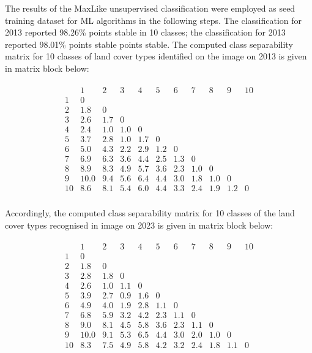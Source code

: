 \documentclass[final,5p,times,twocolumn]{elsarticle}
\begin{document}
The results of the MaxLike unsupervised classification were employed as seed training dataset for ML algorithms in the following steps. The classification for 2013 reported 98.26\% points stable in 10 classes; the classification for 2013 reported 98.01\% points stable points stable. The computed class separability matrix for 10 classes of land cover types identified on the image on 2013 is given in matrix block below:  

\begin{gather}
\begin{matrix}
    & 1 & 2 & 3 & 4 & 5 & 6 & 7 & 8 & 9 & 10 \\
1 & 0 &  &  &  &  &  &  &  &  &  \\
2 & 1.8 & 0 &  &  &  &  &  &  &  &  \\
3 & 2.6 & 1.7 & 0 &  &  &  &  &  &  &  \\
4 & 2.4 & 1.0 & 1.0 & 0 &  &  &  &  &  &  \\
5 & 3.7 & 2.8 & 1.0 & 1.7 & 0 &  &  &  &  &  \\
6 & 5.0 & 4.3 & 2.2 & 2.9 & 1.2 & 0 &  &  &  &  \\
7 & 6.9 & 6.3 & 3.6 & 4.4 & 2.5 & 1.3 & 0 &  &  &  \\
8 & 8.9 & 8.3 & 4.9 & 5.7 & 3.6 & 2.3 & 1.0 & 0 &  &  \\
9 & 10.0 & 9.4 & 5.6 & 6.4 & 4.4 & 3.0 & 1.8 & 1.0 & 0 &  \\
10 & 8.6 & 8.1 & 5.4 & 6.0 & 4.4 & 3.3 & 2.4 & 1.9 & 1.2 & 0 \\              
\end{matrix}
\end{gather}

Accordingly, the computed class separability matrix for 10 classes of the land cover types recognised in image on 2023 is given in matrix block below:  

\begin{gather}
\begin{matrix}
    & 1 & 2 & 3 & 4 & 5 & 6 & 7 & 8 & 9 & 10 \\
1 & 0 &  &  &  &  &  &  &  &  &  \\
2 & 1.8 & 0 &  &  &  &  &  &  &  &  \\
3 & 2.8 & 1.8 & 0 &  &  &  &  &  &  &  \\
4 & 2.6 & 1.0 & 1.1 & 0 &  &  &  &  &  &  \\
5 & 3.9 & 2.7 & 0.9 & 1.6 & 0 &  &  &  &  &  \\          
6 & 4.9 & 4.0 & 1.9 & 2.8 & 1.1 & 0 &  &  &  &  \\   
7 & 6.8 & 5.9 & 3.2 & 4.2 & 2.3 & 1.1 & 0 &  &  &  \\  
8 & 9.0 & 8.1 & 4.5 & 5.8 & 3.6 & 2.3 & 1.1 & 0 &  &  \\
9 & 10.0 & 9.1 & 5.3 & 6.5 & 4.4 & 3.0 & 2.0 & 1.0 & 0 &  \\   
10 & 8.3 & 7.5 & 4.9 & 5.8 & 4.2 & 3.2 & 2.4 & 1.8 & 1.1 & 0 \\      
\end{matrix}
\end{gather}
\end{document}
